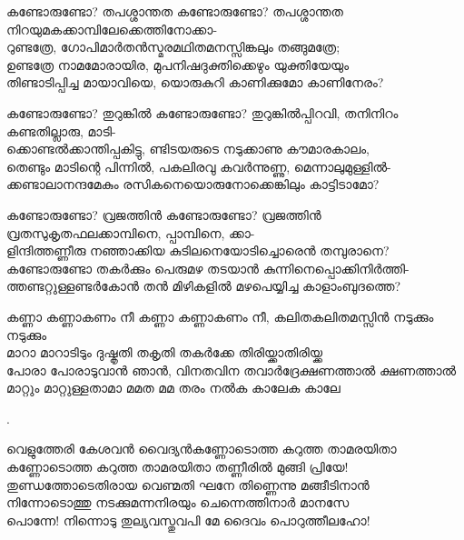 \begin{enumerate}


\begin{slokam}{\VSr}{\VKG}{കണ്ടോരുണ്ടോ? തപശ്ശാന്തത}
കണ്ടോരുണ്ടോ? തപശ്ശാന്തത നിറയുമകക്കാമ്പിലേക്കെത്തിനോക്കാ-\\
റുണ്ടത്രേ, ഗോപിമാർതൻസ്മരമഥിതമനസ്സിങ്കലും തങ്ങുമത്രേ;\\
ഉണ്ടത്രേ നാമമോരായിര, മുപനിഷദുക്തിക്കെഴും യുക്തിയേയും\\
തിണ്ടാടിപ്പിച്ച മായാവിയെ, യൊരുകുറി കാണിക്കുമോ കാണിനേരം?
\end{slokam}


\begin{slokam}{\VSr}{\VKG}{കണ്ടോരുണ്ടോ? തുറുങ്കിൽ}
കണ്ടോരുണ്ടോ? തുറുങ്കിൽപ്പിറവി, തനിനിറം കണ്ടതില്ലാരു, മാടി-\\
ക്കൊണ്ടൽക്കാന്തിപ്പകിട്ടു, ണ്ടിടയരുടെ നടുക്കാണു കൗമാരകാലം,\\
തെണ്ടും മാടിന്റെ പിന്നിൽ, പകലിരവു കവർന്നുണ്ണു, മെന്നാലുമുള്ളിൽ-\\
ക്കണ്ടാലാനന്ദമേകും രസികനെയൊരുനോക്കെങ്കിലും കാട്ടിടാമോ?
\end{slokam}


\begin{slokam}{\VSr}{\VKG}{കണ്ടോരുണ്ടോ? വ്രജത്തിൻ}
കണ്ടോരുണ്ടോ? വ്രജത്തിൻ വ്രതസുകൃതഫലക്കാമ്പിനെ, പ്പാമ്പിനെ, ക്കാ-\\
ളിന്ദിത്തണ്ണീരു നഞ്ഞാക്കിയ കുടിലനെയോടിച്ചൊരെൻ തമ്പുരാനെ?\\
കണ്ടോരുണ്ടോ തകർക്കും പെരുമഴ തടയാൻ കുന്നിനെപ്പൊക്കിനിർത്തി-\\
ത്തണ്ടറ്റുള്ളണ്ടർകോൻ തൻ മിഴികളിൽ മഴപെയ്യിച്ച കാളാംബുദത്തെ?
\end{slokam}


\begin{slokam}{\VSr}{\AUK}{കണ്ണാ കണ്ണാകണം നീ}
കണ്ണാ കണ്ണാകണം നീ, കലിതകലിതമസ്സിൻ നടുക്കും നടുക്കും \\
മാറാ മാറാടിടും ദുഷ്കൃതി തകൃതി തകർക്കേ തിരിയ്ക്കാതിരിയ്ക്ക \\
പോരാ പോരാടുവാൻ ഞാൻ, വിനതവിന തവാർദ്രേക്ഷണത്താൽ ക്ഷണത്താൽ \\
മാറ്റും മാറ്റുള്ളതാമാ മമത മമ തരം നൽക കാലേക കാലേ 
\end{slokam}


.


\begin{slokam}{\VSv}{വെളുത്തേരി കേശവൻ വൈദ്യൻ}{കണ്ണോടൊത്ത കറുത്ത താമരയിതാ}
 കണ്ണോടൊത്ത കറുത്ത താമരയിതാ തണ്ണീരിൽ മുങ്ങി പ്രിയേ!\\
 തുണ്ഡത്തോടെതിരായ വെണ്മതി ഘനേ തിണ്ണെന്നു മങ്ങീടിനാൻ\\
 നിന്നോടൊത്തു നടക്കുമന്നനിരയും ചെന്നെത്തിനാർ മാനസേ\\
 പൊന്നേ! നിന്നൊടു തുല്യവസ്തുവപി മേ ദൈവം പൊറുത്തീലഹോ!
\end{slokam}


\end{enumerate}
